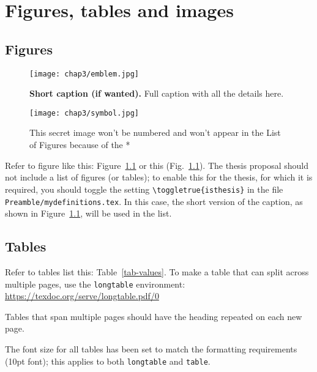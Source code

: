 

\chapter{Figures, tables and images} \label{chap-3}

\section{Figures}

\begin{figure}
\center
\texttt{[image: chap3/emblem.jpg]} 
\caption[Short caption for List of Figures]{{\bfseries Short caption (if wanted).} Full caption with all the details here.}
\label{fig-example}
\end{figure}

\begin{figure}
\center
\texttt{[image: chap3/symbol.jpg]} 
\caption*{This secret image won't be numbered and won't appear in the List of Figures because of the *}
\end{figure}

Refer to figure like this: Figure~\ref{fig-example} or this (Fig.~\ref{fig-example}). The thesis proposal should not include
a list of figures (or tables); to enable this for the thesis, for which it is
required, you should toggle the setting \texttt{\textbackslash toggletrue\{isthesis\}}
in the file \texttt{Preamble/mydefinitions.tex}. In this case, the short version of the caption,
as shown in Figure~\ref{fig-example}, will be used in the list.


\section{Tables}


Refer to tables list this: Table~\ref{tab-values}. To make a table that
can split across multiple pages, use the \texttt{longtable} environment:
\url{https://texdoc.org/serve/longtable.pdf/0}

Tables that span multiple pages should have the heading repeated on each
new page.

The font size for all tables has been set to match the formatting requirements
(10pt font); this applies to both \texttt{longtable} and \texttt{table}.

